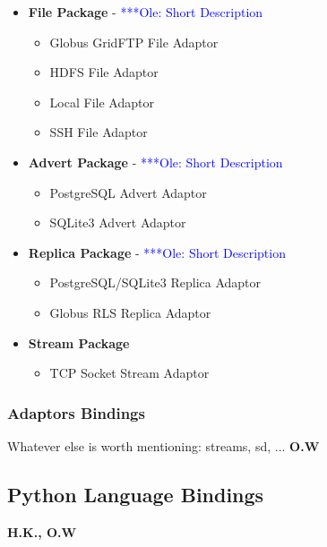 \documentclass[a4paper,10pt]{article}
\newcommand{\onote}[1]{  {\textcolor{blue}     { ***Ole: #1 }}}
\newcommand{\onote}[1]{}
\begin{document}
 \begin{itemize}

\item \textbf{File Package} - \onote{Short Description}

\begin{itemize}
\item Globus GridFTP File Adaptor
\item HDFS File Adaptor
\item Local File Adaptor
\item SSH File Adaptor

\end{itemize}

\item \textbf{Advert Package} - \onote{Short Description}

\begin{itemize}
\item PostgreSQL Advert Adaptor
\item SQLite3 Advert Adaptor
\end{itemize}

\item \textbf{Replica Package} - \onote{Short Description}

\begin{itemize}
\item PostgreSQL/SQLite3 Replica Adaptor
\item Globus RLS Replica Adaptor
\end{itemize}

\item \textbf{Stream Package}

\begin{itemize}
\item TCP Socket Stream Adaptor
\end{itemize}

\end{itemize}
 

 \subsubsection{Adaptors Bindings}
 Whatever else is worth mentioning: streams, sd, ... \textbf{O.W}


 \subsection{Python Language Bindings}
 \textbf{H.K., O.W}
 
\end{document}
